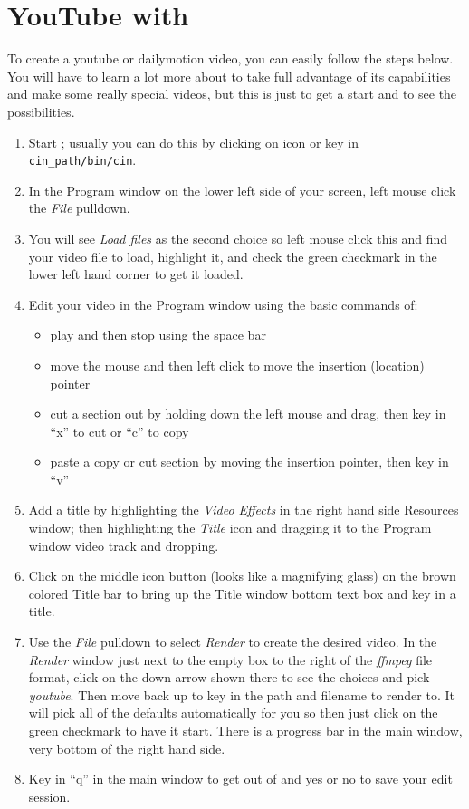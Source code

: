\section{YouTube with \CGG{}}%
\label{sec:youtube_with_cinelerra}

To create a youtube or dailymotion video, you can easily follow the steps below.  You will have to learn a lot more about \CGG{} to take full advantage of its capabilities and make some really special videos, but this is just to get a start and to see the possibilities.

\begin{enumerate}
	\item Start \CGG{}; usually you can do this by clicking on \CGG{} icon or key in \texttt{{cin\_path}/bin/cin}.
	\item In the Program window on the lower left side of your screen, left mouse click the \textit{File} pulldown.
	\item You will see \textit{Load files} as the second choice so left mouse click this and find your video file to
	load, highlight it, and check the green checkmark in the lower left hand corner to get it loaded.
	\item Edit your video in the Program window using the basic commands of:
	\begin{itemize}
		\item play and then stop using the space bar
		\item move the mouse and then left click to move the insertion (location) pointer
		\item cut a section out by holding down the left mouse and drag, then key in “x” to cut or “c” to copy
		\item paste a copy or cut section by moving the insertion pointer, then key in “v”
	\end{itemize}
    \item Add a title by highlighting the \textit{Video Effects} in the right hand side Resources window; then
    highlighting the \textit{Title} icon and dragging it to the Program window video track and dropping.
    \item Click on the middle icon button (looks like a magnifying glass) on the brown colored Title bar to
    bring up the Title window bottom text box and key in a title.
    \item Use the \textit{File} pulldown to select \textit{Render} to create the desired video.  In the \textit{Render} window just next to the empty box to the right of the \textit{ffmpeg} file format, click on the down arrow shown there
    to see the choices and pick \textit{youtube}.  Then move back up to key in the path and filename to render
    to.  It will pick all of the defaults automatically for you so then just click on the green checkmark to
    have it start.  There is a progress bar in the main window, very bottom of the right hand side.
    \item Key in “q” in the main window to get out of \CGG{} and yes or no to save your edit session.
\end{enumerate}


